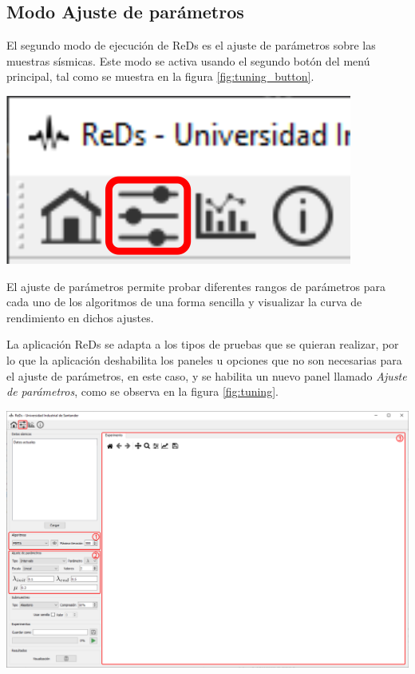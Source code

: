 \documentclass[12pt,twoside,letter]{ol-softwaremanual}
\newenvironment{Figure}
  {\par\medskip\noindent\minipage{\linewidth}}
  {\endminipage\par\medskip}
\begin{document}
\vspace{0.5cm}
\subsection{Modo Ajuste de parámetros}

\begin{multicols}{2}

El segundo modo de ejecución de ReDs es el ajuste de parámetros sobre las muestras sísmicas. Este modo se activa usando el segundo botón del menú principal, tal como se muestra en la figura \ref{fig:tuning_button}.

\begin{Figure}
    \centering
    \includegraphics[width=0.4\linewidth]{tuning-tab.png}
    \label{fig:tuning_button}
\end{Figure}

\end{multicols}

El ajuste de parámetros permite probar diferentes rangos de parámetros para cada uno de los algoritmos de una forma sencilla y visualizar la curva de rendimiento en dichos ajustes.

La aplicación ReDs se adapta a los tipos de pruebas que se quieran realizar, por lo que la aplicación deshabilita los paneles u opciones que no son necesarias para el ajuste de parámetros, en este caso, y se habilita un nuevo panel llamado \emph{Ajuste de parámetros}, como se observa en la figura \ref{fig:tuning}.

\begin{Figure}
    \centering
    \includegraphics[width=1\linewidth]{tuning.png}
    \label{fig:tuning}
\end{Figure}
\end{document}
